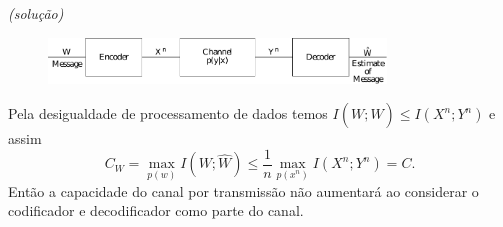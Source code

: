 \begin{frame}[allowframebreaks]
\begin{exercise}
  \examplebreak

  \textit{(solução)}

  \begin{figure}[h!]
  \centering
  \includegraphics[width=0.8\textwidth]{images/ex716.pdf}
  \label{fig:ex716}
  \end{figure}
 
  Pela desigualdade de processamento de dados temos $I(W;\hat{W}) \leq I(X^n;Y^n)$ e
  assim
  \begin{equation}
  C_W = \max_{p(w)} I(W;\hat{W}) \leq \frac{1}{n} \max_{p(x^n)} I(X^n;Y^n) = C .
  \end{equation}
  Então a capacidade do canal por transmissão não aumentará ao considerar o
  codificador e decodificador como parte do canal.

  \end{exercise}

\end{frame}

